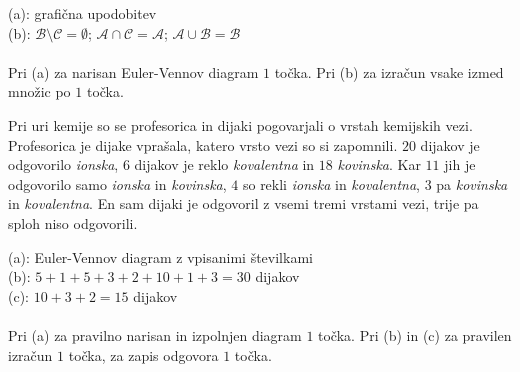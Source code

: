 \documentclass[addpoints,12pt]{exam}
\begin{document}
\begin{questions}

    \begin{solution}[7cm]
        (a): grafična upodobitev \\
        (b): $\mathcal{B}\setminus\mathcal{C}=\emptyset$; $\mathcal{A}\cap\mathcal{C}=\mathcal{A}$; $\mathcal{A}\cup\mathcal{B}=\mathcal{B}$ \\ \\
        Pri (a) za narisan Euler-Vennov diagram $1$ točka. Pri (b) za izračun vsake izmed množic po $1$ točka.
    \end{solution}






    \newpage
    \question
    Pri uri kemije so se profesorica in dijaki pogovarjali o vrstah kemijskih vezi.  Profesorica je dijake vprašala, katero vrsto vezi so si zapomnili.
    $20$ dijakov je odgovorilo \textit{ionska}, $6$ dijakov je reklo \textit{kovalentna} in $18$ \textit{kovinska}. Kar $11$ jih je odgovorilo samo \textit{ionska} in \textit{kovinska}, $4$ so rekli \textit{ionska} in \textit{kovalentna},
    $3$ pa \textit{kovinska} in \textit{kovalentna}. En sam dijaki je odgovoril z vsemi tremi vrstami vezi, trije pa sploh niso odgovorili. 

    \begin{solution}[8cm]
        (a): Euler-Vennov diagram z vpisanimi številkami \\
        (b): $5+1+5+3+2+10+1+3=30$ dijakov \\
        (c): $10+3+2=15$ dijakov \\ \\
        Pri (a) za pravilno narisan in izpolnjen diagram $1$ točka. Pri (b) in (c) za pravilen izračun $1$ točka, za zapis odgovora $1$ točka.
    \end{solution}





\end{questions}
\end{document}
